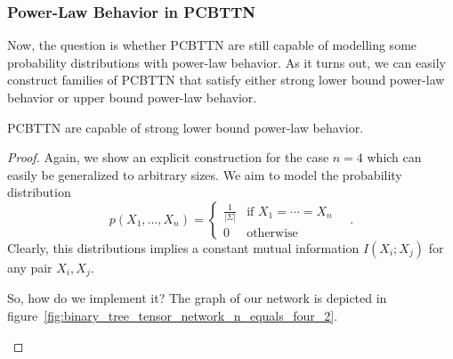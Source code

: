 \documentclass[../../main.tex]{subfiles}
\begin{document}
    \subsubsection{Power-Law Behavior in PCBTTN}
    Now, the question is whether PCBTTN are still capable of modelling some probability distributions with power-law behavior. As it turns out, we can easily construct families of PCBTTN that satisfy either strong lower bound power-law behavior or upper bound power-law behavior.

    \begin{theorem}
        PCBTTN are capable of strong lower bound power-law behavior.
    \end{theorem}
    \begin{proof}
        Again, we show an explicit construction for the case $n = 4$ which can easily be generalized to arbitrary sizes. We aim to model the probability distribution
        \[
            p(X_1, \dots, X_n) =
            \begin{cases}
                \frac{1}{|\Sigma|} & \text{if } X_1 = \cdots = X_n \\
                0 & \text{otherwise}
            \end{cases}
            \quad .
        \]
        Clearly, this distributions implies a constant mutual information $I(X_i; X_j)$ for any pair $X_i, X_j$.

        So, how do we implement it? The graph of our network is depicted in figure~\ref{fig:binary_tree_tensor_network_n_equals_four_2}.
        \begin{figure}[h]
            \centering
\end{figure}
\end{proof}
\end{document}
